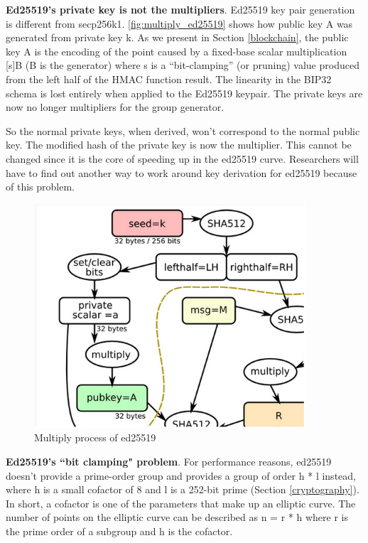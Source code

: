 \begin{adjustwidth}{1cm}{}
    \bigskip
    {\textbf{Ed25519's private key is not the multipliers}}. Ed25519 key pair generation is different from secp256k1. \autoref{fig:multiply_ed25519} shows how public key A was generated from private key k. As we present in Section \ref{blockchain}, the public key A is the encoding of the point caused by a fixed-base scalar multiplication [s]B (B is the generator) where s is a “bit-clamping” (or pruning) value produced from the left half of the HMAC function result. The linearity in the BIP32 schema is lost entirely when applied to the Ed25519 keypair. The private keys are now no longer multipliers for the group generator.

    So the normal private keys, when derived, won’t correspond to the normal public key. The modified hash of the private key is now the multiplier. This cannot be changed since it is the core of speeding up in the ed25519 curve. Researchers will have to find out another way to work around key derivation for ed25519 because of this problem.

    \bigskip
    \begin{figure}[ht!]
        \centering
        \includegraphics[width=0.9\textwidth]{images/ed25519_generator_multiplier.png}
        \caption[Multiply process of ed25519]{Multiply process of ed25519 \cite{learnme}}
        \label{fig:multiply_ed25519}
    \end{figure}


    \bigskip
    {\textbf{Ed25519's “bit clamping" problem}}. For performance reasons, ed25519 doesn't provide a prime-order group and provides a group of order h * l instead, where h is a small cofactor of 8 and l is a 252-bit prime (Section \ref{cryptography}). In short, a cofactor is one of the parameters that make up an elliptic curve. The number of points on the elliptic curve can be described as n = r * h where r is the prime order of a subgroup and h is the cofactor.


\end{adjustwidth}

